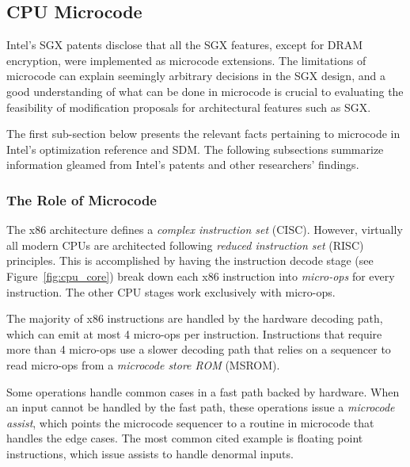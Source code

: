\subsection{CPU Microcode}
\label{sec:microcode}

Intel's SGX patents disclose that all the SGX features, except for DRAM
encryption, were implemented as microcode extensions. The limitations of
microcode can explain seemingly arbitrary decisions in the SGX design, and a
good understanding of what can be done in microcode is crucial to evaluating
the feasibility of modification proposals for architectural features such as
SGX.

The first sub-section below presents the relevant facts pertaining to microcode
in Intel's optimization reference \cite{intel2014optimization} and SDM. The
following subsections summarize information gleamed from Intel's patents and
other researchers' findings.


\subsubsection{The Role of Microcode}
\label{sec:microcode_role}


The x86 architecture defines a \textit{complex instruction set} (CISC).
However, virtually all modern CPUs are architected following \textit{reduced
instruction set} (RISC) principles. This is accomplished by having the
instruction decode stage (see Figure~\ref{fig:cpu_core}) break down each x86
instruction into \textit{micro-ops} for every instruction. The other CPU stages
work exclusively with micro-ops.


The majority of x86 instructions are handled by the hardware decoding path,
which can emit at most 4 micro-ops per instruction. Instructions that require
more than 4 micro-ops use a slower decoding path that relies on a sequencer to
read micro-ops from a \textit{microcode store ROM} (MSROM).


Some operations handle common cases in a fast path backed by hardware. When
an input cannot be handled by the fast path, these operations issue a
\textit{microcode assist}, which points the microcode sequencer to a routine in
microcode that handles the edge cases. The most common cited example is
floating point instructions, which issue assists to handle denormal inputs.

